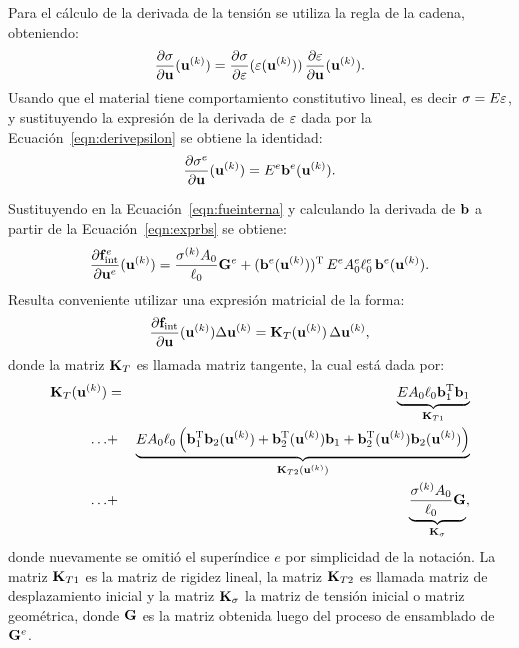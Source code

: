 Para el cálculo de la derivada de la tensión se utiliza la regla de la cadena, obteniendo:
%
\begin{equation}
\frac{ \partial \sigma}{\partial {\bf u}}({\bf u}^{(k)}) = \frac{\partial \sigma}{\partial \varepsilon}(\varepsilon({\bf u}^{(k)}))\, \frac{\partial \varepsilon}{\partial {\bf u}}({\bf u}^{(k)}).
\end{equation}
%
Usando que el material tiene comportamiento constitutivo lineal, es decir $\sigma = E \varepsilon$, y sustituyendo la expresión de la derivada de $\varepsilon$ dada por la Ecuación~\eqref{eqn:derivepsilon} se obtiene la identidad:
\begin{equation}
\frac{ \partial \sigma^e}{\partial {\bf u}}({\bf u}^{(k)}) = E^e {\bf b}^e({\bf u}^{(k)}).
\end{equation}

Sustituyendo en la Ecuación~\eqref{eqn:fueinterna} y calculando la derivada de ${\bf b}$ a partir de la Ecuación~\eqref{eqn:exprbs} se obtiene:
%
\begin{equation}
\frac{\partial {\bf f}_{\text{int}}^e } {\partial {\bf u}^e} ({\bf u}^{(k)})
= \frac{\sigma^{(k)} A_0 }{\ell_0} {\bf G}^e
+  ({\bf b}^e({\bf u}^{(k)}))^{\text{T}} \, E^e A_0^e \ell_0^e \, {\bf b}^e({\bf u}^{(k)}).
\end{equation}
%
Resulta conveniente utilizar una expresión matricial de la forma:
%
\begin{equation}
\frac{\partial {\bf f}_{\text{int}} } {\partial {\bf u}} ({\bf u}^{(k)}) \Delta {\bf u}^{(k)} = {\bf K}_{T}({\bf u}^{(k)}) \, \Delta {\bf u}^{(k)},
\end{equation}
%
donde la matriz ${\bf K}_T$ es llamada matriz tangente, la cual está dada por:
%
\begin{eqnarray}
{\bf K}_T({\bf u}^{(k)}) &=& \underbrace{E A_0 \ell_0 {\bf b}^{\text{T}}_{1} {\bf b}_{1}}_{{\bf K}_{T1}} \nonumber\\
\dots & +& \underbrace{E A_0 \ell_0 \left( {\bf b}^{\text{T}}_{1} {\bf b}_{2}({\bf u}^{(k)})  + {\bf b}^{\text{T}}_{2}({\bf u}^{(k)}) {\bf b}_{1} + {\bf b}^{\text{T}}_{2}({\bf u}^{(k)}) {\bf b}_{2}({\bf u}^{(k)}) \right) }_{{\bf K}_{T2}({\bf u}^{(k)})} \nonumber\\
\dots  & +& \underbrace{\frac{\sigma^{(k)} A_0}{\ell_0} {\bf G}}_{{\bf K}_\sigma},
\end{eqnarray}
%
donde nuevamente se omitió el superíndice $e$ por simplicidad de la notación. %
%
La matriz ${\bf K}_{T1}$ es la matriz de rigidez lineal, la matriz ${\bf K}_{T2}$ es llamada matriz de desplazamiento inicial y la matriz ${\bf K}_{\sigma}$ la matriz de tensión inicial o matriz geométrica, donde ${\bf G}$ es la matriz obtenida luego del proceso de ensamblado de ${\bf G}^e$.


